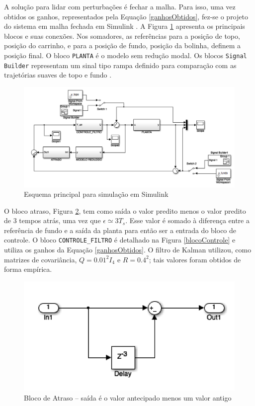  A solução para lidar com perturbações é fechar a malha. Para isso, uma vez obtidos os ganhos, representados pela Equação \ref{ganhosObtidos}, fez-se o projeto do sistema em malha fechada em Simulink \cite{simulink}. A Figura \ref{topModel} apresenta os principais blocos e suas conexões. Nos somadores, as referências para a posição de topo, posição do carrinho, e para a posição de fundo, posição da bolinha, definem a posição final. O bloco \texttt{PLANTA} é o modelo sem redução modal. Os blocos \texttt{Signal Builder} representam um sinal tipo rampa definido para comparação com as trajetórias suaves de topo e fundo \cite{rafaelMestrado}. 
 

\begin{figure}[!ht]
\centering
\caption{Esquema principal para simulação em Simulink\label{topModel}}
\includegraphics[width=0.9\linewidth]{figs/resultados/simulink/top}
\end{figure}

 O bloco atraso, Figura \ref{blocoAtraso}, tem como saída o valor predito menos o valor predito de 3 tempos atrás, uma vez que $\epsilon \simeq 3T_s$. Esse valor é somado à diferença entre a referência de fundo e a saída da planta para então ser a entrada do bloco de controle. O bloco \texttt{CONTROLE\_FILTRO} é detalhado na Figura \ref{blocoControle} e utiliza os ganhos da Equação \ref{ganhosObtidos}. O filtro de Kalman utilizou, como matrizes de covariância, $Q = 0.01^2 I_4$ e $R = 0.4^2$; tais valores foram obtidos de forma empírica.

\begin{figure}[!ht]
\centering
\caption{Bloco de Atraso -- saída é o valor antecipado menos um valor antigo\label{blocoAtraso}}
\includegraphics[width=0.5\linewidth]{figs/resultados/simulink/atraso}
\end{figure}

